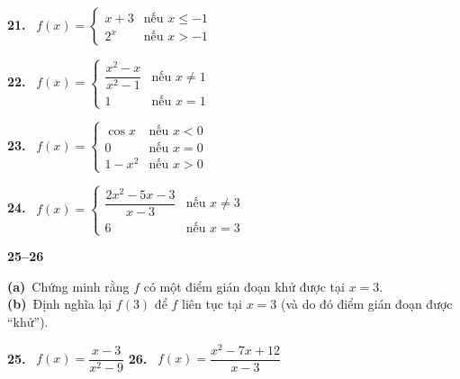 \noindent
\begin{minipage}[t]{0.485\textwidth}

\noindent
\textbf{21.} \ $f(x) = \begin{cases} x + 3 & \text{nếu } x \le -1 \\ 2^x & \text{nếu } x > -1 \end{cases}$ \hfill {}

\vspace{7pt}
\noindent
\textbf{22.} \ $f(x) = \begin{cases} \dfrac{x^2 - x}{x^2 - 1} & \text{nếu } x \neq 1 \\[6pt] 1 & \text{nếu } x = 1 \end{cases}$ \hfill {}

\vspace{7pt}
\noindent
\textbf{23.} \ $f(x) = \begin{cases} \cos x & \text{nếu } x < 0 \\ 0 & \text{nếu } x = 0 \\ 1 - x^2 & \text{nếu } x > 0 \end{cases}$ \hfill {}

\vspace{7pt}
\noindent
\textbf{24.} \ $f(x) = \begin{cases} \dfrac{2x^2 - 5x - 3}{x - 3} & \text{nếu } x \neq 3 \\[6pt] 6 & \text{nếu } x = 3 \end{cases}$ \hfill {}

\vspace{6pt}
\noindent{\color{lightcyanline}\rule{\linewidth}{0.8pt}}
\vspace{5pt}

\noindent
\textbf{\color{stewartcyan}25--26}\enspace
\parbox[t]{0.82\linewidth}{%
  \textbf{(a)}~Chứng minh rằng $f$ có một điểm gián đoạn khử được tại $x = 3$.\\[2pt]
  \textbf{(b)}~Định nghĩa lại $f(3)$ để $f$ liên tục tại $x = 3$ (và do đó điểm gián đoạn được ``khử'').%
}

\vspace{6pt}
\noindent
\textbf{25.} \ $f(x) = \dfrac{x - 3}{x^2 - 9}$ \hfill \textbf{26.} \ $f(x) = \dfrac{x^2 - 7x + 12}{x - 3}$

\vspace{6pt}
\noindent{\color{lightcyanline}\rule{\linewidth}{0.8pt}}
\vspace{5pt}


\end{minipage}
